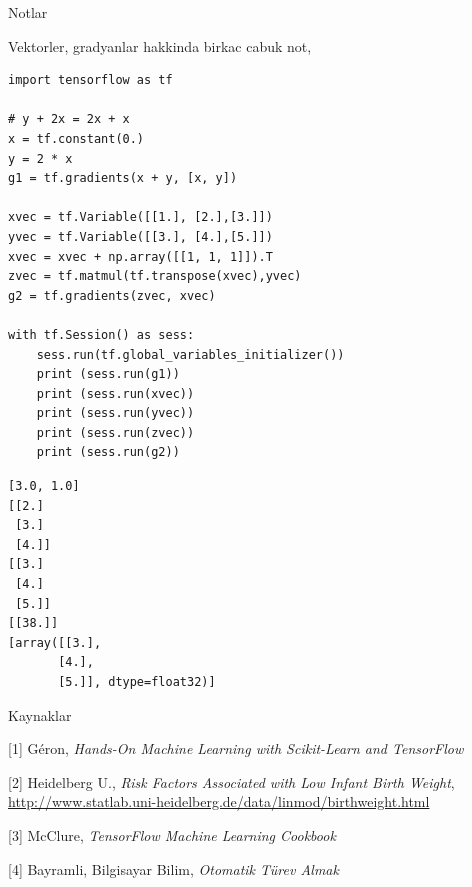 \documentclass[12pt,fleqn]{article}\usepackage{../../common}
\begin{document}
Notlar

Vektorler, gradyanlar hakkinda birkac cabuk not,

\begin{verbatim}
import tensorflow as tf

# y + 2x = 2x + x
x = tf.constant(0.)
y = 2 * x
g1 = tf.gradients(x + y, [x, y])

xvec = tf.Variable([[1.], [2.],[3.]]) 
yvec = tf.Variable([[3.], [4.],[5.]]) 
xvec = xvec + np.array([[1, 1, 1]]).T
zvec = tf.matmul(tf.transpose(xvec),yvec)
g2 = tf.gradients(zvec, xvec)

with tf.Session() as sess:
    sess.run(tf.global_variables_initializer())
    print (sess.run(g1))
    print (sess.run(xvec))
    print (sess.run(yvec))
    print (sess.run(zvec))
    print (sess.run(g2))
\end{verbatim}

\begin{verbatim}
[3.0, 1.0]
[[2.]
 [3.]
 [4.]]
[[3.]
 [4.]
 [5.]]
[[38.]]
[array([[3.],
       [4.],
       [5.]], dtype=float32)]
\end{verbatim}

Kaynaklar 

[1] Géron, {\em Hands-On Machine Learning with Scikit-Learn and TensorFlow}

[2] Heidelberg U., {\em Risk Factors Associated with Low Infant Birth Weight}, \url{http://www.statlab.uni-heidelberg.de/data/linmod/birthweight.html}

[3] McClure, {\em TensorFlow Machine Learning Cookbook}

[4] Bayramli, Bilgisayar Bilim, {\em Otomatik Türev Almak}
\end{document}
